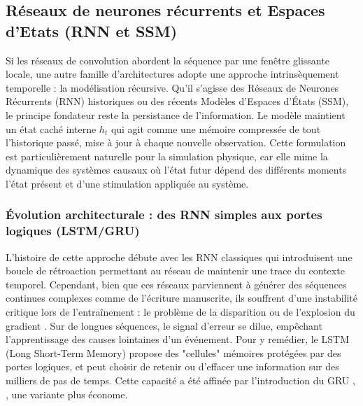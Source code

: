 \subsection{Réseaux de neurones récurrents et Espaces d'Etats (RNN et SSM)}
\label{seq:RNN}
Si les réseaux de convolution abordent la séquence par une fenêtre glissante locale, une autre famille d'architectures adopte une approche intrinsèquement temporelle : la modélisation récursive. Qu'il s'agisse des Réseaux de Neurones Récurrents (RNN) historiques ou des récents Modèles d'Espaces d'États (SSM), le principe fondateur reste la persistance de l'information. Le modèle maintient un état caché interne $h_t$ qui agit comme une mémoire compressée de tout l'historique passé, mise à jour à chaque nouvelle observation. Cette formulation est particulièrement naturelle pour la simulation physique, car elle mime la dynamique des systèmes causaux où l'état futur dépend des différents moments l'état présent et d'une stimulation appliquée au système.

\subsubsection{Évolution architecturale : des RNN simples aux portes logiques (LSTM/GRU)}
L'histoire de cette approche débute avec les RNN classiques \cite{elman_finding_1990} qui introduisent une boucle de rétroaction permettant au réseau de maintenir une trace du contexte temporel. Cependant, bien que ces réseaux parviennent à générer des séquences continues complexes comme de l'écriture manuscrite, ils souffrent d'une instabilité critique lors de l'entraînement : le problème de la disparition ou de l'explosion du gradient \cite{graves_generating_2014}. Sur de longues séquences, le signal d'erreur se dilue, empêchant l'apprentissage des causes lointaines d'un événement. Pour y remédier, le LSTM (Long Short-Term Memory) \cite{hochreiter_long_1997} propose des "cellules" mémoires protégées par des portes logiques, et peut choisir de retenir ou d'effacer une information sur des milliers de pas de temps. Cette capacité a été affinée par l'introduction du GRU \cite{cho_properties_2014}, \cite{chung_empirical_2014}, une variante plus économe.


